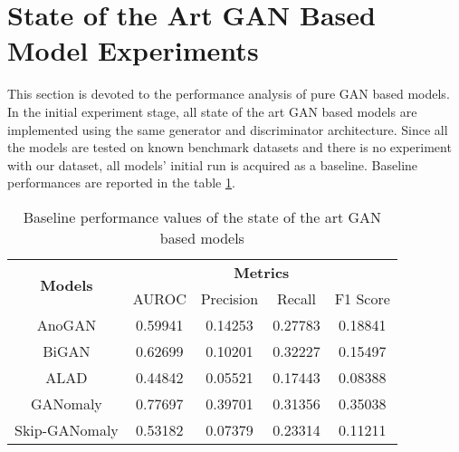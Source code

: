 \section{State of the Art GAN Based Model Experiments}
\label{sec:exp_pure_gan}
This section is devoted to the performance analysis of pure GAN based models. In the initial experiment stage, 
all state of the art GAN based models are implemented using the same generator and discriminator architecture. 
Since all the models are tested on known benchmark datasets and there is no experiment with our dataset, all models' 
initial run is acquired as a baseline. Baseline performances are reported in the table \ref{tab:exp_baseline}.

\begin{longtable}[c]{|c|cccc|}
	\caption{Baseline performance values of the state of the art GAN based models}
	\label{tab:exp_baseline}\\
	\hline
	\multirow{2}{*}{\textbf{Models}} & \multicolumn{4}{c|}{\textbf{Metrics}} \\ \cline{2-5} 
	& AUROC & Precision & Recall & F1 Score \\ \hline
	\endhead
 \multicolumn{1}{|c|}{AnoGAN} & \multicolumn{1}{c}{0.59941} & \multicolumn{1}{c}{0.14253} & \multicolumn{1}{c}{0.27783} & \multicolumn{1}{c|}{0.18841} \\ \hline
\multicolumn{1}{|c|}{BiGAN} & \multicolumn{1}{c}{0.62699} & \multicolumn{1}{c}{0.10201} & \multicolumn{1}{c}{0.32227} & \multicolumn{1}{c|}{0.15497} \\ \hline
\multicolumn{1}{|c|}{ALAD} & \multicolumn{1}{c}{0.44842} & \multicolumn{1}{c}{0.05521} & \multicolumn{1}{c}{0.17443} & \multicolumn{1}{c|}{0.08388} \\ \hline
\multicolumn{1}{|c|}{GANomaly} & \multicolumn{1}{c}{0.77697} & \multicolumn{1}{c}{0.39701} & \multicolumn{1}{c}{0.31356} & \multicolumn{1}{c|}{0.35038} \\ \hline
\multicolumn{1}{|c|}{Skip-GANomaly} & \multicolumn{1}{c}{0.53182} & \multicolumn{1}{c}{0.07379} & \multicolumn{1}{c}{0.23314} & \multicolumn{1}{c|}{0.11211} \\ \hline
\end{longtable}

